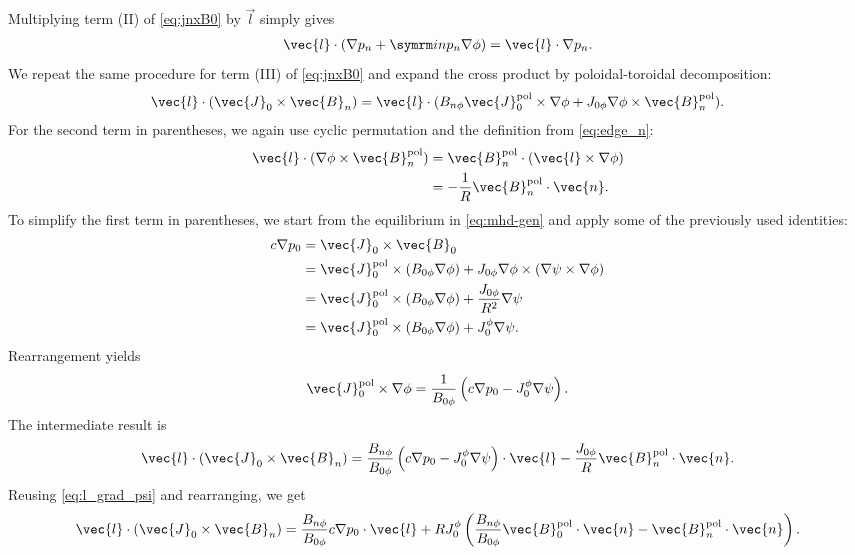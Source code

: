 Multiplying term (II) of \cref{eq:jnxB0} by $\vec{l}$ simply gives
\begin{gather}
  \vec{l} \cdot (\grad p_{n} + \im n p_{n} \grad \phi) = \vec{l} \cdot \grad p_{n}. \label{eq:jnxB0_II}
\end{gather}
We repeat the same procedure for term (III) of \cref{eq:jnxB0} and expand the cross product by poloidal-toroidal decomposition:
\begin{gather}
  \vec{l} \cdot (\vec{J}_{0} \times \vec{B}_{n}) = \vec{l} \cdot (B_{n \phi} \vec{J}_{0}^{\pol} \times \grad \phi + J_{0 \phi} \grad \phi \times \vec{B}_{n}^{\pol}).
\end{gather}
For the second term in parentheses, we again use cyclic permutation and the definition from \cref{eq:edge_n}:
\begin{align}
  \vec{l} \cdot (\grad \phi \times \vec{B}_{n}^{\pol}) &= \vec{B}_{n}^{\pol} \cdot (\vec{l} \times \grad \phi) \nonumber \\
  &= -\frac{1}{R} \vec{B}_{n}^{\pol} \cdot \vec{n}.
\end{align}
To simplify the first term in parentheses, we start from the equilibrium in \cref{eq:mhd-gen} and apply some of the previously used identities:
\begin{align}
  c \grad p_{0} &= \vec{J}_{0} \times \vec{B}_{0} \nonumber \\
  &= \vec{J}_{0}^{\pol} \times (B_{0 \phi} \grad \phi) + J_{0 \phi} \grad \phi \times (\grad \psi \times \grad \phi) \nonumber \\
  &= \vec{J}_{0}^{\pol} \times (B_{0 \phi} \grad \phi) + \frac{J_{0 \phi}}{R^{2}} \grad \psi \nonumber \\
  &= \vec{J}_{0}^{\pol} \times (B_{0 \phi} \grad \phi) + J_{0}^{\phi} \grad \psi.
\end{align}
Rearrangement yields
\begin{gather}
  \vec{J}_{0}^{\pol} \times \grad \phi = \frac{1}{B_{0 \phi}} \left( c \grad p_{0} - J_{0}^{\phi} \grad \psi \right).
\end{gather}
The intermediate result is
\begin{gather}
  \vec{l} \cdot (\vec{J}_{0} \times \vec{B}_{n}) = \frac{B_{n \phi}}{B_{0 \phi}} \left ( c \grad p_{0} - J_{0}^{\phi} \grad \psi \right ) \cdot \vec{l} - \frac{J_{0 \phi}}{R} \vec{B}_{n}^{\pol} \cdot \vec{n}.
\end{gather}
Reusing \cref{eq:l_grad_psi} and rearranging, we get
\begin{gather}
  \vec{l} \cdot (\vec{J}_{0} \times \vec{B}_{n}) = \frac{B_{n \phi}}{B_{0 \phi}} c \grad p_{0} \cdot \vec{l} + R J_{0}^{\phi} \left ( \frac{B_{n \phi}}{B_{0 \phi}} \vec{B}_{0}^{\pol} \cdot \vec{n} - \vec{B}_{n}^{\pol} \cdot \vec{n} \right ). \label{eq:jnxB0_III}
\end{gather}
